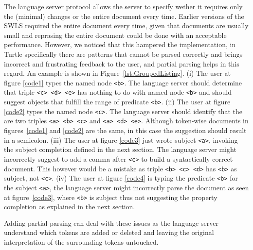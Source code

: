 The language server protocol allows the server to specify wether it requires only the (minimal) changes or the entire document every time.
Earlier versions of the SWLS required the entire document every time, given that documents are usually small and reprasing the entire document could be done with an acceptable performance.
However, we noticed that this hampered the implementation, in Turtle specifically there are patterns that cannot be parsed correctly and brings incorrect and frustrating feedback to the user, and partial parsing helps in this regard.
An example is shown in Figure~\ref{lst:GroupedListing}.
  (i) The user at figure \ref{code1} types the named node \texttt{<b>}. The language server should determine that triple \texttt{<c> <d> <e>} has nothing to do with named node \texttt{<b>} and should suggest objects that fulfill the range of predicate \texttt{<b>}. 
  (ii) The user at figure \ref{code2} types the named node \texttt{<c>}. The language server should identify that the are two triples \texttt{<a> <b> <c>} and \texttt{<a> <d> <e>}. Although token-wise documents in figures~\ref{code1} and \ref{code2} are the same, in this case the suggestion should result in a semicolon.
  (iii) The user at figure \ref{code3} just wrote subject \texttt{<a>}, invoking the subject completion defined in the next section.
     The language server might incorrectly suggest to add a comma after \texttt{<c>} to build a syntactically correct document. 
     This however would be a mistake as triple \texttt{<b> <c> <d>} has \texttt{<b>} as subject, not \texttt{<c>}.
  (iv) The user at figure \ref{code4} is typing the predicate \texttt{<b>} for the subject \texttt{<a>}, the language server might incorrectly parse the document as seen at figure~\ref{code3}, where \texttt{<b>} is subject thus not suggesting the property completion as explained in the next section.

  Adding partial parsing can deal with these issues as the language server understand which tokens are added or deleted and leaving the original interpretation of the surrounding tokens untouched.

